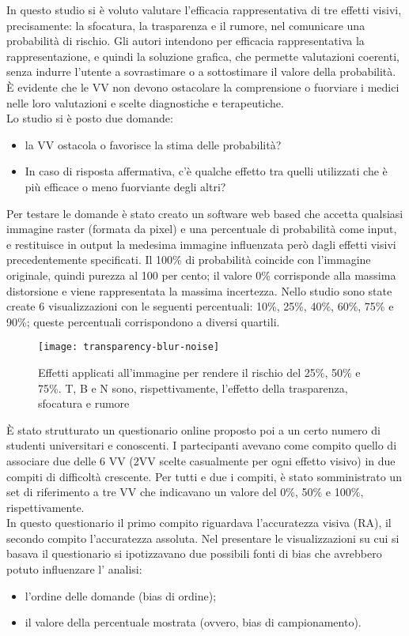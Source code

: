 In questo studio si è voluto valutare l'efficacia rappresentativa di tre effetti visivi, precisamente: la sfocatura, la trasparenza e il rumore, nel comunicare una probabilità di rischio. Gli autori intendono per efficacia rappresentativa la rappresentazione, e quindi la soluzione grafica, che permette valutazioni coerenti, senza indurre l'utente a sovrastimare o a sottostimare il valore della probabilità. È evidente che le VV non devono ostacolare la comprensione o fuorviare i medici nelle loro valutazioni e scelte diagnostiche e terapeutiche.\\ 
Lo studio si è posto due domande:
\begin{itemize}
    \item la VV ostacola o favorisce la stima delle probabilità?
    \item In caso di risposta affermativa, c'è qualche effetto tra quelli utilizzati che è più efficace o meno
    fuorviante degli altri?
\end{itemize}
Per testare le domande è stato creato un software web based che accetta qualsiasi immagine raster (formata da pixel) e una percentuale di probabilità come input, e restituisce in output la medesima immagine influenzata però dagli effetti visivi precedentemente specificati. Il 100\% di probabilità coincide con l'immagine originale, quindi purezza al 100 per cento; il valore 0\% corrisponde alla massima distorsione e viene rappresentata la massima incertezza.
Nello studio sono state create 6 visualizzazioni con le seguenti percentuali: 10\%, 25\%, 40\%, 60\%, 75\% e 90\%; queste percentuali corrispondono a diversi \gls{quartili}.

\begin{figure}[!ht] 
    \centering 
    \texttt{[image: transparency-blur-noise]} 
    \caption{Effetti applicati all'immagine per rendere il rischio del 25\%, 50\% e 75\%. T, B e N sono, rispettivamente, l'effetto della trasparenza, sfocatura e rumore}
\end{figure}

È stato strutturato un questionario online proposto poi a un certo numero di studenti universitari e conoscenti. I partecipanti avevano come compito quello di associare due delle 6 VV (2VV scelte casualmente per ogni effetto visivo) in due compiti di difficoltà crescente. Per tutti e due i compiti, è stato somministrato un set di riferimento a tre VV che indicavano un valore del 0\%, 50\% e 100\%, rispettivamente.\\
In questo questionario il primo compito riguardava l'accuratezza visiva (RA), il secondo compito l'accuratezza assoluta.
Nel presentare le visualizzazioni su cui si basava il questionario si ipotizzavano due possibili fonti di bias che avrebbero potuto influenzare l' analisi:
\begin{itemize}
\item l'ordine delle domande (bias di ordine);
\item il valore della percentuale mostrata (ovvero, bias di campionamento).
\end{itemize}


